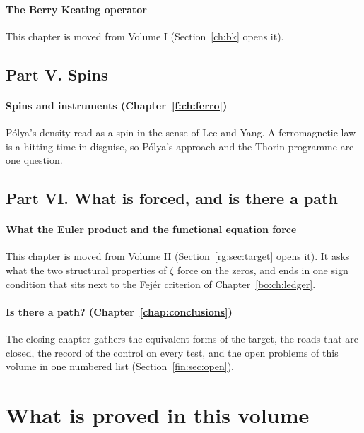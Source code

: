 \paragraph{The Berry Keating operator} This chapter is moved from Volume I (Section~\ref{ch:bk} opens it).

\subsection*{Part V. Spins}

\paragraph{Spins and instruments (Chapter~\ref{f:ch:ferro})} P\'olya's density read as a spin in the sense of Lee and Yang. A ferromagnetic law is a hitting time in disguise, so P\'olya's approach and the Thorin programme are one question.

\subsection*{Part VI. What is forced, and is there a path}

\paragraph{What the Euler product and the functional equation force} This chapter is moved from Volume II (Section~\ref{rg:sec:target} opens it). It asks what the two structural properties of $\zeta$ force on the zeros, and ends in one sign condition that sits next to the Fej\'er criterion of Chapter~\ref{bo:ch:ledger}.

\paragraph{Is there a path? (Chapter~\ref{chap:conclusions})} The closing chapter gathers the equivalent forms of the target, the roads that are closed, the record of the control on every test, and the open problems of this volume in one numbered list (Section~\ref{fin:sec:open}).

\section{What is proved in this volume}\label{v3:sec:proved}

